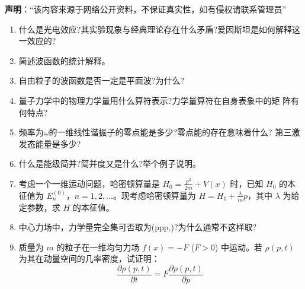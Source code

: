 
\textbf{声明}：“该内容来源于网络公开资料，不保证真实性，如有侵权请联系管理员”


\begin{enumerate}
\item 什么是光电效应?其实验现象与经典理论存在什么矛盾?爱因斯坦是如何解释这一效应的?
\item 简述波函数的统计解释。
\item 自由粒子的波函数是否一定是平面波?为什么?
\item 量子力学中的物理力学量用什么算符表示?力学量算符在自身表象中的矩
阵有何特点?
\item 频率为$\omega$的一维线性谐振子的零点能是多少?零点能的存在意味着什么?
第三激发态能量是多少?
\item 什么是能级简并?简并度又是什么?举个例子说明。
\item 考虑一个一维运动问题，哈密顿算量是 $H_0 = \frac{p^2}{2m} + V(x)$ 时，已知 $H_0$ 的本征值为 $E_n^{(0)}$，$n = 1, 2, \dots$。现考虑哈密顿算量为 $H = H_0 + \frac{\lambda}{m} p$，其中 $\lambda$ 为给定参数，求 $H$ 的本征值。
\item 中心力场中，力学量完全集可否取为(ppp,)?为什么通常不这样取?
\item 质量为 $m$ 的粒子在一维均匀力场 $f(x) = -F$ ($F > 0$) 中运动。若 $\rho(p, t)$ 为其在动量空间的几率密度，试证明：
$$\frac{\partial \rho(p, t)}{\partial t} = F \frac{\partial \rho(p, t)}{\partial p}~$$
\end{enumerate}
